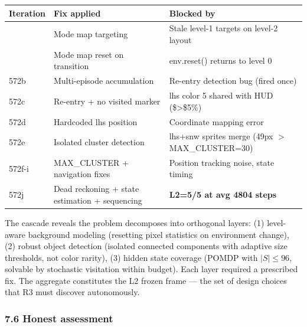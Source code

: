 \documentclass[
  11pt,
]{article}
\newcounter{none} %
\begin{document}
{\def\LTcaptype{none} %
\begin{longtable}[]{@{}
  >{\raggedright\arraybackslash}p{}
  >{\raggedright\arraybackslash}p{}
  >{\raggedright\arraybackslash}p{}@{}}
\toprule\noalign{}
\begin{minipage}[b]{\linewidth}\raggedright
Iteration
\end{minipage} & \begin{minipage}[b]{\linewidth}\raggedright
Fix applied
\end{minipage} & \begin{minipage}[b]{\linewidth}\raggedright
Blocked by
\end{minipage} \\
\midrule\noalign{}
\endhead
\bottomrule\noalign{}
\endlastfoot
571 & Mode map targeting & Stale level-1 targets on level-2 layout \\
572 & Mode map reset on transition & env.reset() returns to level 0 \\
572b & Multi-episode accumulation & Re-entry detection bug (fired
once) \\
572c & Re-entry + no visited marker & lhs color 5 shared with HUD
(\$\textgreater\$5\%) \\
572d & Hardcoded lhs position & Coordinate mapping error \\
572e & Isolated cluster detection & lhs+snw sprites merge (49px \(>\)
MAX\_CLUSTER=30) \\
572f-i & MAX\_CLUSTER + navigation fixes & Position tracking noise,
state timing \\
572j & Dead reckoning + state estimation + sequencing & \textbf{L2=5/5
at avg 4804 steps} \\
\end{longtable}
}

The cascade reveals the problem decomposes into orthogonal layers: (1)
level-aware background modeling (resetting pixel statistics on
environment change), (2) robust object detection (isolated connected
components with adaptive size thresholds, not color rarity), (3) hidden
state coverage (POMDP with \(|S| \leq 96\), solvable by stochastic
visitation within budget). Each layer required a prescribed fix. The
aggregate constitutes the L2 frozen frame --- the set of design choices
that R3 must discover autonomously.

\subsubsection{7.6 Honest assessment}\label{honest-assessment}
\end{document}
